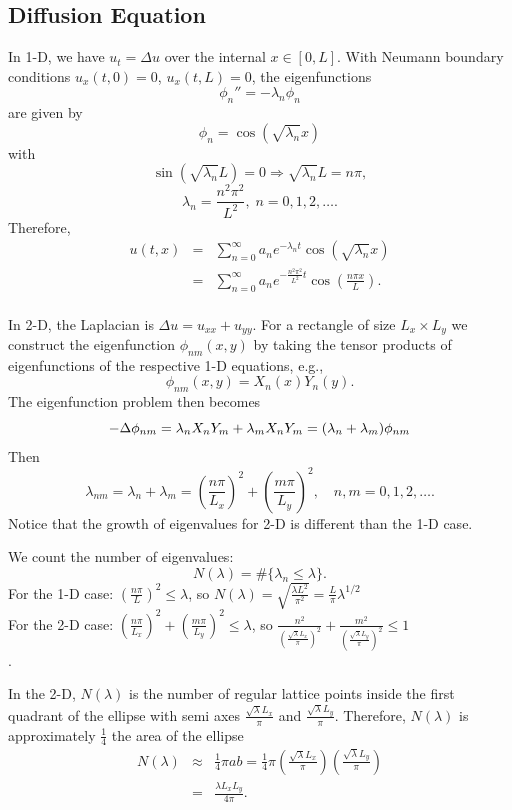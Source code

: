 \subsection{Diffusion Equation}
In 1-D, we have $u_t=\Delta u$ over the internal $x\in[0,L]$. With Neumann boundary conditions $u_x(t,0)=0$, $u_x(t,L)=0$, the eigenfunctions $$\phi_n''=-\lambda_n \phi_n$$ are given by
$$\phi_n = \cos(\sqrt{\lambda_n} x)$$
with
$$\sin{(\sqrt{\lambda_n} L)} = 0 \Rightarrow \sqrt{\lambda_n} L=n\pi,$$
$$\lambda_n=\frac{n^2 \pi^2}{L^2}, \; n=0,1,2,\ldots.$$
Therefore,
\begin{eqnarray*}
u(t,x)&=&\sum_{n=0}^\infty a_n e^{-\lambda_n t} \cos{(\sqrt{\lambda_n} x)}\\
&=&\sum_{n=0}^\infty a_n e^{-\frac{n^2 \pi^2}{L^2} t} \cos\left(\frac{n\pi x}{L}\right).\\
\end{eqnarray*}

In 2-D, the Laplacian is $\Delta u=u_{xx} + u_{yy}$. For a rectangle of size $L_x\times L_y$ we construct the eigenfunction $\phi_{n m}(x,y)$ by taking the tensor products of eigenfunctions of the respective 1-D equations, e.g., $$\phi_{n m}(x,y) = X_n(x)Y_n(y).$$ The eigenfunction problem then becomes
\begin{equation*}
-\Delta\phi_{nm} = \lambda_nX_nY_m + \lambda_mX_nY_m = (\lambda_n+\lambda_m) \phi_{nm}\\
\end{equation*}
Then $$\lambda_{nm} = \lambda_n+\lambda_m = \left(\frac{n\pi}{L_x}\right)^2+\left(\frac{m\pi}{L_y}\right)^2, \quad n,m=0,1,2,\ldots.$$ Notice that the growth of eigenvalues for 2-D is different than the 1-D case.

We count the number of eigenvalues: $$N(\lambda) = \#\{\lambda_n \le \lambda\}.$$
For the 1-D case: $\left(\frac{n\pi}{L}\right)^2 \le \lambda$, so $N(\lambda)=\sqrt{\frac{\lambda L^2}{\pi^2}}=\frac{L}{\pi}\lambda^{1/2}$\\
For the 2-D case: $\left(\frac{n\pi}{L_x}\right)^2 + \left(\frac{m\pi}{L_y}\right)^2\le \lambda$, so $\frac{n^2}{\left(\frac{\sqrt{\lambda}L_x}{\pi}\right)^2} + \frac{m^2}{\left(\frac{\sqrt{\lambda} L_y}{\pi}\right)^2} \le 1$\\.

In the 2-D, $N(\lambda)$ is the number of regular lattice points inside the first quadrant of the ellipse with semi axes $\frac{\sqrt{\lambda}L_x}{\pi}$ and $\frac{\sqrt{\lambda}L_y}{\pi}$. Therefore, $N(\lambda)$ is approximately $\frac{1}{4}$ the area of the ellipse
\begin{eqnarray*}
N(\lambda) & \approx & \frac{1}{4} \pi a b = \frac{1}{4}\pi \left(\frac{\sqrt{\lambda} L_x}{\pi}\right) \left(\frac{\sqrt{\lambda} L_y}{\pi}\right)\\
&=& \frac{\lambda L_x L_y}{4\pi}.
\end{eqnarray*}

